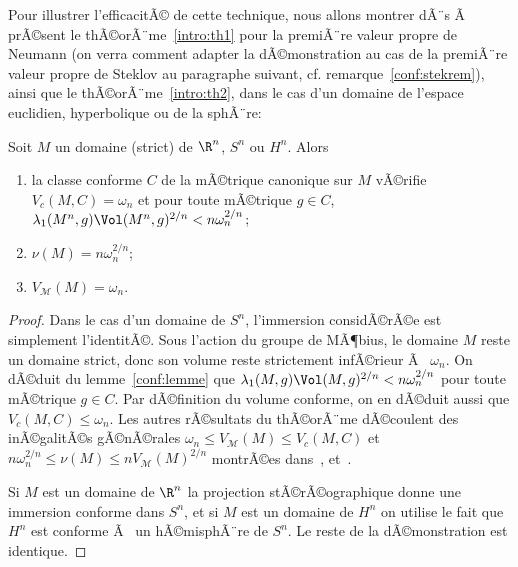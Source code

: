 \documentclass[11pt,a4paper]{smfart}
\begin{document}
Pour illustrer l'efficacitÃ© de cette technique, nous allons montrer
dÃ¨s Ã  prÃ©sent le thÃ©orÃ¨me~\ref{intro:th1} pour  la premiÃ¨re valeur
propre de Neumann (on verra comment adapter la dÃ©monstration au cas de la 
premiÃ¨re valeur propre de Steklov au paragraphe suivant, cf. 
remarque~\ref{conf:stekrem}),
ainsi que le thÃ©orÃ¨me~\ref{intro:th2}, dans 
le cas d'un domaine de l'espace euclidien, hyperbolique ou de la sphÃ¨re:
\begin{theo}\label{conf:th}
Soit $M$ un domaine (strict) de $\R^n$, $S^n$ ou $H^n$. Alors
\begin{enumerate}
\item la classe conforme $C$ de la mÃ©trique canonique sur $M$ vÃ©rifie 
$V_c(M,C)=\omega_n$ et pour toute mÃ©trique $g\in C$,
$\lambda_1(M^n,g)\Vol(M^n,g)^{2/n}< n\omega_n^{2/n}$;
\item $\nu(M)=n\omega_n^{2/n}$;
\item $V_\mathcal{M}(M)=\omega_n$.
\end{enumerate}
\end{theo}
\begin{proof}
Dans le cas d'un domaine de $S^n$, l'immersion considÃ©rÃ©e est simplement
l'identitÃ©. Sous l'action du groupe de MÃ¶bius, le domaine $M$ reste
un domaine strict, donc son volume reste strictement infÃ©rieur Ã  $\omega_n$.
On dÃ©duit du lemme~\ref{conf:lemme} que $\lambda_1(M,g)\Vol(M,g)^{2/n}<
n\omega_n^{2/n}$ pour toute mÃ©trique $g\in C$. Par dÃ©finition du volume 
conforme, on en dÃ©duit aussi que $V_c(M,C)\leq\omega_n$. Les autres rÃ©sultats
du thÃ©orÃ¨me dÃ©coulent des inÃ©galitÃ©s gÃ©nÃ©rales $\omega_n\leq V_{\mathcal M}(M)
\leq V_c(M,C)$ et $n\omega_n^{2/n}\leq\nu(M)\leq n V_{\mathcal M}(M)^{2/n}$
montrÃ©es dans~\cite{esi86}, \cite{fn99} et~\cite{ja08}.

Si $M$ est un domaine de $\R^n$ la projection stÃ©rÃ©ographique 
donne une immersion conforme dans $S^n$, et si $M$ est un domaine
de $H^n$ on utilise le fait que $H^n$ est conforme Ã  un hÃ©misphÃ¨re
de $S^n$. Le reste de la dÃ©monstration est identique.
\end{proof}
\end{document}

